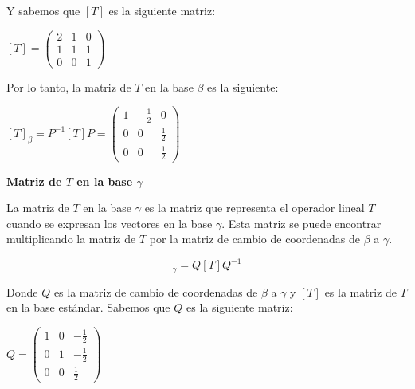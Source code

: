 \begin{enumerate}
    Y sabemos que $[T]$ es la siguiente matriz:

    \begin{center}
        $
        [T] = 
            \begin{pmatrix}
                2 & 1 & 0 \\
                1 & 1 & 1 \\
                0 & 0 & 1
            \end{pmatrix}
        $
    \end{center}

    Por lo tanto, la matriz de $T$ en la base $\beta$ es la siguiente:

    \begin{center}
        $
        [T]_{\beta} = P^{-1} [T] P = 
            \begin{pmatrix}
                1 & -\frac{1}{2} & 0 \\
                0 & 0 & \frac{1}{2} \\
                0 & 0 & \frac{1}{2}
            \end{pmatrix}    
        $
    \end{center}
    

    \textbf{Matriz de $T$ en la base $\gamma$}

    \vspace{2mm}    

    La matriz de $T$ en la base $\gamma$ es la matriz que representa el operador lineal $T$ cuando se
    expresan los vectores en la base $\gamma$. Esta matriz se puede encontrar multiplicando la matriz
    de $T$ por la matriz de cambio de coordenadas de $\beta$ a $\gamma$.

    \begin{equation*}
        [T]_{\gamma} = Q [T] Q^{-1}
    \end{equation*}

    Donde $Q$ es la matriz de cambio de coordenadas de $\beta$ a $\gamma$ y $[T]$ es la matriz de $T$
    en la base estándar. Sabemos que $Q$ es la siguiente matriz:

    \begin{center}
        $
        Q = 
            \begin{pmatrix}
                1 & 0 & -\frac{1}{2} \\
                0 & 1 & -\frac{1}{2} \\
                0 & 0 & \frac{1}{2}
            \end{pmatrix}
        $
    \end{center}


\end{enumerate}
